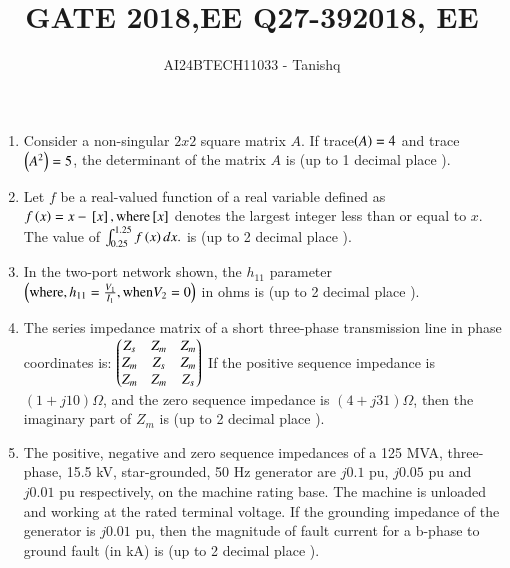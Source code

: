 \documentclass[journal]{IEEEtran}
\begin{document}

\vspace{3cm}
\author{AI24BTECH11033 - Tanishq}
\title{GATE 2018,EE Q27-39}
{\let\newpage\relax\maketitle}
\title{2018, EE}
\renewcommand{\thefigure}{\theenumi}
\renewcommand{\thetable}{\theenumi}
\setlength{\intextsep}{10pt} %
\renewcommand{\thetable}{\theenumi}
\begin{enumerate}
\item Consider a non-singular $2x2$ square matrix $A$. If trace$\left(A\right) = 4$ and trace$\left(A^2\right) = 5$, the determinant of the matrix $A$ is \underline{\hspace{1cm}} (up to 1 decimal place ).
\item Let $f$ be a real-valued function of a real variable defined as $f\left(x\right) = x - {}\left[x\right], \text{where} {}\left[x\right]$ denotes the largest integer less than or equal to $x$. The value of $\int_{0.25}^{1.25} f\left(x\right) dx.$ is \underline{\hspace{1cm}} (up to 2 decimal place ).
\item In the two-port network shown, the $h_{11}$ parameter $\left(\text{where}, h_{11} = \frac{V_1}{I_1}, \text{when} V_2 = 0\right)$ in ohms is \underline{\hspace{1cm}} (up to 2 decimal place ).
\begin{figure}[!ht]
    \centering
    \label{fig:power system network}
    \end{figure}
\item The series impedance matrix of a short three-phase transmission line in phase coordinates is:
$\begin{pmatrix}
Z_s & Z_m & Z_m \\
Z_m & Z_s & Z_m \\
Z_m & Z_m & Z_s\end{pmatrix}$
If the positive sequence impedance is $(1 + j10) \Omega$, and the zero sequence impedance is $(4 + j31) \Omega$, then the imaginary part of $Z_m$ is \underline{\hspace{1cm}} (up to 2 decimal place ).
\item The positive, negative and zero sequence impedances of a 125 MVA, three-phase, 15.5 kV, star-grounded, 50 Hz generator are $j0.1$ pu, $j0.05$ pu and $j0.01$ pu respectively, on the machine rating base. The machine is unloaded and working at the rated terminal voltage. If the grounding impedance of the generator is $j0.01$ pu, then the magnitude of fault current for a b-phase to ground fault (in kA) is \underline{\hspace{1cm}} (up to 2 decimal place ). 

\end{enumerate}
\end{document}
